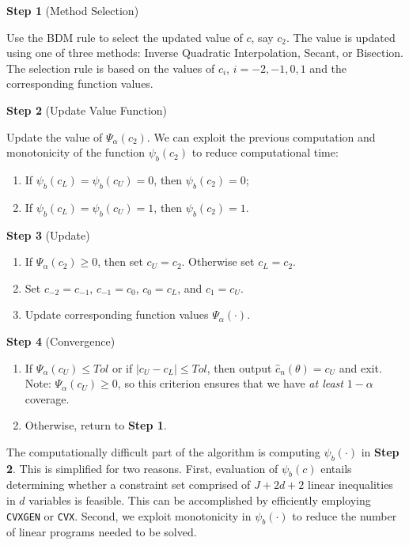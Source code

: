 \documentclass[12pt]{article}
\def\code#1{\texttt{#1}}
\begin{document}
\textbf{Step 1} (Method Selection)

Use the BDM rule to select the updated value of $c$, say $c_2$.  The value is updated using one of three methods: Inverse Quadratic Interpolation, Secant, or Bisection.  The selection rule is based on the values of $c_{i}$, $i=-2,-1,0,1$ and the corresponding function values.

\textbf{Step 2} (Update Value Function)

Update the value of $\Psi_{\alpha}(c_2)$.  We can exploit the previous computation and monotonicity of the function $\psi_b(c_2)$ to reduce computational time:
\begin{enumerate}%
\item If $\psi_b(c_L) = \psi_b(c_U) = 0$, then $\psi_b(c_2) = 0$;
\item If $\psi_b(c_L) = \psi_b(c_U) = 1$, then $\psi_b(c_2) = 1$.
\end{enumerate}


\textbf{Step 3} (Update)
\begin{enumerate}
\item If $\Psi_{\alpha}(c_2) \geq 0$, then set $c_U = c_2$.  Otherwise set $c_L = c_2$.
\item Set $c_{-2} = c_{-1}$, $c_{-1} = c_0$, $c_0 = c_L$, and $c_1 = c_U$.
\item Update corresponding function values $\Psi_{\alpha}(\cdot)$.
\end{enumerate}

\textbf{Step 4} (Convergence)
\begin{enumerate}
\item If $\Psi_{\alpha}(c_U) \leq \mathit{Tol}$ or if $|c_U - c_L| \leq \mathit{Tol}$, then output $\hat c_n(\theta) = c_U$ and exit. Note: $\Psi_{\alpha}(c_U) \geq 0$, so this criterion ensures that we have \emph{at least} $1-\alpha$ coverage.
\item Otherwise, return to \textbf{Step 1}.
\end{enumerate}
The computationally difficult part of the algorithm is computing $\psi_b(\cdot)$ in \textbf{Step 2}.  This is simplified for two reasons.  First, evaluation of $\psi_b(c)$ entails determining whether a constraint set comprised of $J+2d+2$ linear inequalities in $d$ variables is feasible.  This can be accomplished by efficiently employing \code{CVXGEN} or \code{CVX}.  Second, we exploit monotonicity in $\psi_b(\cdot)$ to reduce the number of linear programs needed to be solved.
\end{document}
